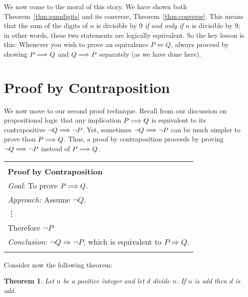 \documentclass[11pt]{article}
\newcounter{thm}
\newtheorem{theorem}{Theorem}[thm]
\begin{document}
We now come to the moral of this story. We have shown both Theorem~\ref{thm:sumdigits} and its converse, Theorem~\ref{thm:converse}. This means that the sum of the digits of $n$ is divisible by $9$ \emph{if and only if} $n$ is divisible by $9$; in other words, these two statements are logically equivalent. So the key lesson is this: Whenever you wish to prove an equivalence $P\iff Q$, always proceed by showing $P\Longrightarrow Q$ and $Q\Longrightarrow P$ separately (as we have done here).

\section{Proof by Contraposition}\label{scn:contrapositive}

We now move to our second proof technique. Recall from our discussion on propositional logic that any implication $P\Longrightarrow Q$ is equivalent to its {contrapositive} $\neg Q\Longrightarrow \neg P$. Yet, sometimes $\neg Q\Longrightarrow \neg P$ can be much simpler to prove than $P\Longrightarrow Q$. Thus, a proof by contraposition proceeds by proving $\neg Q\Longrightarrow \neg P$ instead of $P\Longrightarrow Q$.


\vspace{.2cm}

\begin{tabular}{|l|}
 \hline \\
        {\bf Proof by Contraposition}\\
        \hspace{.5cm}\emph{Goal}: To prove $P \Longrightarrow Q$. \\
        \hspace{.5cm}\emph{Approach:} Assume $\neg Q$. \\
  \hspace{3cm}\vdots \\
  \hspace{2.2cm}Therefore $\neg P$ \\
        \hspace{.5cm}\emph{Conclusion}: $\neg Q \Longrightarrow \neg P$, which is equivalent to $P\Longrightarrow Q$. \\\\
 \hline
\end{tabular}
\vspace{.2cm}

Consider now the following theorem:

\begin{theorem}\label{thm:oddodd}
    Let $n$ be a positive integer and let $d$ divide $n$. If $n$ is odd then $d$ is odd.
\end{theorem}
\end{document}
